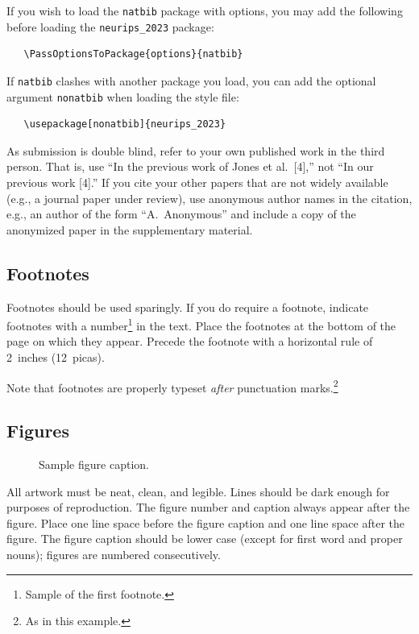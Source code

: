 \documentclass{article}
\begin{document}
\begin{CJK}{UTF8}{gbsn}
If you wish to load the \verb+natbib+ package with options, you may add the
following before loading the \verb+neurips_2023+ package:
\begin{verbatim}
   \PassOptionsToPackage{options}{natbib}
\end{verbatim}


If \verb+natbib+ clashes with another package you load, you can add the optional
argument \verb+nonatbib+ when loading the style file:
\begin{verbatim}
   \usepackage[nonatbib]{neurips_2023}
\end{verbatim}


As submission is double blind, refer to your own published work in the third
person. That is, use ``In the previous work of Jones et al.\ [4],'' not ``In our
previous work [4].'' If you cite your other papers that are not widely available
(e.g., a journal paper under review), use anonymous author names in the
citation, e.g., an author of the form ``A.\ Anonymous'' and include a copy of the anonymized paper in the supplementary material.


\subsection{Footnotes}


Footnotes should be used sparingly.  If you do require a footnote, indicate
footnotes with a number\footnote{Sample of the first footnote.} in the
text. Place the footnotes at the bottom of the page on which they appear.
Precede the footnote with a horizontal rule of 2~inches (12~picas).


Note that footnotes are properly typeset \emph{after} punctuation
marks.\footnote{As in this example.}


\subsection{Figures}


\begin{figure}
  \centering
  \fbox{\rule[-.5cm]{0cm}{4cm} \rule[-.5cm]{4cm}{0cm}}
  \caption{Sample figure caption.}
\end{figure}


All artwork must be neat, clean, and legible. Lines should be dark enough for
purposes of reproduction. The figure number and caption always appear after the
figure. Place one line space before the figure caption and one line space after
the figure. The figure caption should be lower case (except for first word and
proper nouns); figures are numbered consecutively.



\end{CJK}
\end{document}
